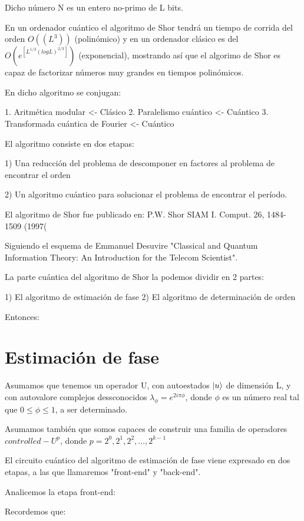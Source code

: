 Dicho número N es un entero no-primo de L bits.

En un ordenador cuántico el algoritmo de Shor tendrá un tiempo de corrida del orden $O((L^3))$ (polinómico) y en un ordenador clásico es del $O(e^[L^{1/3} (log L)^{2/3}])$ (exponencial), mostrando así que el algorimo de Shor es capaz de factorizar números muy grandes en tiempos polinómicos.

En dicho algoritmo se conjugan:

1. Aritmética modular <- Clásico
2. Paralelismo cuántico <- Cuántico
3. Transformada cuántica de Fourier <- Cuántico

El algoritmo consiste en dos etapas:

1) Una reducción del problema de descomponer en factores al problema de encontrar el orden

2) Un algoritmo cuántico para solucionar el problema de encontrar el período.

El algoritmo de Shor fue publicado en: P.W. Shor SIAM I. Comput. 26, 1484-1509 (1997(

Siguiendo el esquema de Emmanuel Desuvire "Classical and Quantum Information Theory: An Introduction for the Telecom Scientist".

La parte cuántica del algoritmo de Shor la podemos dividir en 2 partes:

1) El algoritmo de estimación de fase
2) El algoritmo de determinación de orden

Entonces:

\section{Estimación de fase}

Asumamos que tenemos un operador U, con autoestados $\ket{u}$ de dimensión L, y con autovalore complejos dessconocidos $\lambda_\phi = e^{2 i \pi \phi}$, donde $\phi$ es un número real tal que $0 \leq \phi \leq 1$, a ser determinado.

Asumamos también que somos capaces de construir una familia de operadores $controlled-U^p$, donde $p = 2^0, 2^1, 2^2, ..., 2^{k-1}$

El circuito cuántico del algoritmo de estimación de fase viene expresado en dos etapas, a las que llamaremos "front-end" y "back-end".

Analicemos la etapa front-end:


Recordemos que:

